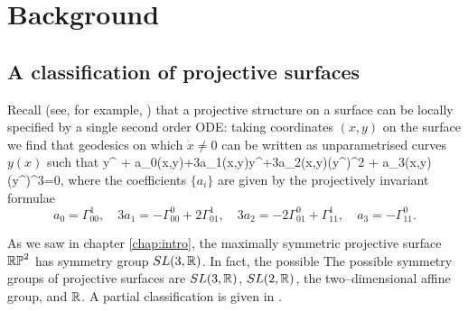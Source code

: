  

 


\section{Background}
\label{sec:background}

\subsection{A classification of projective surfaces}
Recall (see, for example, \cite{BDE}) that a projective structure on a surface can be locally specified by a single second order ODE: taking coordinates $(x,y)$ on the surface we find that geodesics on which $\dot{x}\neq 0$ can be written as unparametrised curves $y(x)$ such that
\be
\label{odealice}
y^{\prime \prime} + a_0(x,y)+3a_1(x,y)y^{\prime}+3a_2(x,y)(y^{\prime})^2 + a_3(x,y)(y^\prime)^3=0,
\ee
where the coefficients $\{a_i\}$ are given by the projectively invariant formulae
\[
a_0=\Gamma^1_{00},\quad
3a_1=-\Gamma^0_{00}+2\Gamma^1_{01},\quad
3a_2=-2\Gamma^0_{01}+\Gamma^1_{11},\quad
a_3=-\Gamma^0_{11}.
\]

As we saw in chapter \ref{chap:intro}, the maximally symmetric projective surface $\mathbb{RP}^2$ has symmetry group $SL(3,\mathbb{R})$. In fact, the possible The possible symmetry groups of projective surfaces are $SL(3, \mathbb{R})$, $SL(2,\mathbb{R})$, the two--dimensional affine group, and $\mathbb{R}$. A partial classification is given in \cite{Bryant}.

